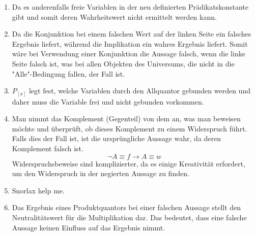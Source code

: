 \documentclass[a4paper]{article}
\begin{document}
\begin{enumerate}
		\item
		Da es anderenfalls freie Variablen in der neu definierten Prädikatskonstante gibt und somit deren Wahrheitswert nicht ermittelt werden kann.
		
		\item
		Da die Konjunktion bei einem falschen Wert auf der linken Seite ein falsches Ergebnis liefert, während die Implikation ein wahres Ergebnis liefert. Somit wäre bei Verwendung einer Konjunktion die Aussage falsch, wenn die linke Seite falsch ist, was bei allen Objekten des Universums, die nicht in die "Alle"-Bedingung fallen, der Fall ist.
		
		\item
		$P_[x]$ legt fest, welche Variablen durch den Allquantor gebunden werden und daher muss die Variable frei und nicht gebunden vorkommen.
		
		\item
		Man nimmt das Komplement (Gegenteil) von dem an, was man beweisen möchte und überprüft, ob dieses Komplement zu einem Widerspruch führt. Falls dies der Fall ist, ist die ursprüngliche Aussage wahr, da deren Komplement falsch ist.
		\begin{equation*}
			\lnot A \equiv f \rightarrow A \equiv w
		\end{equation*}
		\newline
		Widerspruchsbeweise sind komplizierter, da es einige Kreativität erfordert, um den Widerspruch in der negierten Aussage zu finden.
		
		\item
		Snorlax help me.
		
		\item
		Das Ergebnis eines Produktquantors bei einer falschen Aussage stellt den Neutralitätswert für die Multiplikation dar. Das bedeutet, dass eine falsche Aussage keinen Einfluss auf das Ergebnis nimmt.
	\end{enumerate}
\end{document}
